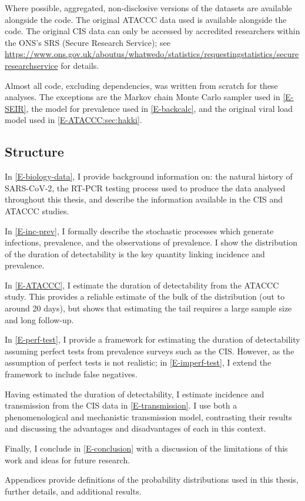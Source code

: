 \documentclass[thesis.tex]{subfiles}
\begin{document}
Where possible, aggregated, non-disclosive versions of the datasets are available alongside the code.
The original ATACCC data used is available alongside the code.
The original CIS data can only be accessed by accredited researchers within the ONS's SRS (Secure Research Service); see \url{https://www.ons.gov.uk/aboutus/whatwedo/statistics/requestingstatistics/secureresearchservice} for details.

Almost all code, excluding dependencies, was written from scratch for these analyses.
The exceptions are the Markov chain Monte Carlo sampler used in \cref{E-SEIR}, the model for prevalence used in \cref{E-backcalc}, and the original viral load model used in \cref{E-ATACCC:sec:hakki}.

\subsection{Structure}

In \cref{E-biology-data}, I provide background information on: the natural history of SARS-CoV-2, the RT-PCR testing process used to produce the data analysed throughout this thesis, and describe the information available in the CIS and ATACCC studies.

In \cref{E-inc-prev}, I formally describe the stochastic processes which generate infections, prevalence, and the observations of prevalence.
I show the distribution of the duration of detectability is the key quantity linking incidence and prevalence.

In \cref{E-ATACCC}, I estimate the duration of detectability from the ATACCC study.
This provides a reliable estimate of the bulk of the distribution (out to around 20 days),  but shows that estimating the tail requires a large sample size and long follow-up. 

In \cref{E-perf-test}, I provide a framework for estimating the duration of detectability assuming perfect tests from prevalence surveys such as the CIS.
However, as the assumption of perfect tests is not realistic; in \cref{E-imperf-test}, I extend the framework to include false negatives.

Having estimated the duration of detectability, I estimate incidence and transmission from the CIS data in \cref{E-transmission}.
I use both a phenomenological and mechanistic transmission model, contrasting their results and discussing the advantages and disadvantages of each in this context.

Finally, I conclude in \cref{E-conclusion} with a discussion of the limitations of this work and ideas for future research.

Appendices provide definitions of the probability distributions used in this thesis, further details, and additional results.


\ifSubfilesClassLoaded{
  \appendix
%   
  \listoftodos
}{}
\end{document}
